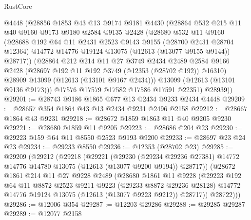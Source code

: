 \begin{lexlean}{RustCore}
\begin{coremodule}
        @4448
        (@28856
          @1853
          @43
          @13
          @9174
          @9181
          @4430
          (@28864
            @532
            @215
            @11
            @40
            @9160
            @9173
            @9180
            @2584
            @9135
            @2428
            (@28680
              @532
              @11
              @9160
              (@28688
                @192
                @64
                @11
                @2431
                @2523
                @9143
                @9155
                (@28700 @2431 @28704 @12364)
                @14772
                @14776
                @19124
                @13075
                (@12613 (@13077 @9155 @9144))
                @28717))
            (@28864
              @212
              @214
              @11
              @27
              @3749
              @2434
              @2489
              @2584
              @9166
              @2428
              (@28697 @192 @11 @192 @3749 (@12353 (@28702 @192)) @16310)
              @28909
              @13099
              (@12613 (@13101 @9167 @2434)))
            @13099
            (@12613 (@13101 @9136 @9173)))
          @17576
          @17579
          @17582
          @17586
          @17591
          @22351)
        @28939))
@29201 := @28743 @9186 @1865 @677 @13 @2434 @9233 @2434 @4448
@29209 := @28657 @354 @1864 @43 @13 @2434 @9231 @2496 @2158
@29212 := @28667 @1864 @43 @9231
@29218 := @28672 @1859 @1863 @11 @40 @9205 @9230
@29221 := @28680 @1859 @11 @9205
@29223 := @28686 @204 @23
@29230 := @29223 @159 @64 @11 @8550 @2523 @9193 @9200
@29233 := @28697 @23 @24 @23
@29234 := @29233 @8550
@29236 := @12353 (@28702 @23)
@29285 := @29209
    (@29212
      (@29218
        (@29221
          (@29230
            (@29234 @29236 @27381)
            @14772
            @14776
            @14780
            @13075
            (@12613 (@13077 @9200 @9194))
            @28717))
        (@28672
          @1861
          @214
          @11
          @27
          @9228
          @2489
          (@28680
            @1861
            @11
            @9228
            (@29223
              @192
              @64
              @11
              @8872
              @2523
              @9211
              @9223
              (@29233 @8872 @29236 @28128)
              @14772
              @14776
              @19124
              @13075
              (@12613 (@13077 @9223 @9212))
              @28717))
          @28722)))
@29286 := @12006 @354
@29287 := @12203 @29286
@29288 := @29285 @29287
@29289 := @12077 @2158

\end{coremodule}
\end{lexlean}
